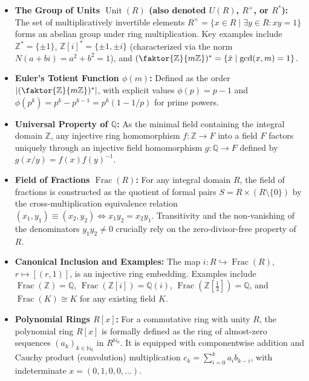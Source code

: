 \begin{overview}
\begin{itemize}
    \item \textbf{The Group of Units $\operatorname{Unit}(R)$ (also denoted $U(R)$, $R^\times$, or $R^*$):} The set of multiplicatively invertible elements $R^\times = \{x \in R \mid \exists y \in R \colon xy = 1\}$ forms an abelian group under ring multiplication. Key examples include $\mathbb{Z}^* = \{\pm 1\}$, $\mathbb{Z}[i]^* = \{\pm 1, \pm i\}$ (characterized via the norm $N(a+bi) = a^2 + b^2 = 1$), and $(\faktor{\mathbb{Z}}{m\mathbb{Z}})^* = \{\bar{x} \mid \gcd(x, m) = 1\}$.
    \item \textbf{Euler's Totient Function $\phi(m)$:} Defined as the order $|(\faktor{\mathbb{Z}}{m\mathbb{Z}})^*|$, with explicit values $\phi(p) = p - 1$ and $\phi(p^k) = p^k - p^{k-1} = p^k(1 - 1/p)$ for prime powers.
    \item \textbf{Universal Property of $\mathbb{Q}$:} As the minimal field containing the integral domain $\mathbb{Z}$, any injective ring homomorphism $f \colon \mathbb{Z} \to F$ into a field $F$ factors uniquely through an injective field homomorphism $g \colon \mathbb{Q} \to F$ defined by $g(x/y) = f(x)f(y)^{-1}$.
    \item \textbf{Field of Fractions $\operatorname{Frac}(R)$:} For any integral domain $R$, the field of fractions is constructed as the quotient of formal pairs $S = R \times (R \setminus \{0\})$ by the cross-multiplication equivalence relation $(x_1, y_1) \equiv (x_2, y_2) \iff x_1 y_2 = x_2 y_1$. Transitivity and the non-vanishing of the denominators $y_1 y_2 \neq 0$ crucially rely on the zero-divisor-free property of $R$.
    \item \textbf{Canonical Inclusion and Examples:} The map $i \colon R \hookrightarrow \operatorname{Frac}(R)$, $r \mapsto [(r, 1)]$, is an injective ring embedding. Examples include $\operatorname{Frac}(\mathbb{Z}) = \mathbb{Q}$, $\operatorname{Frac}(\mathbb{Z}[i]) = \mathbb{Q}(i)$, $\operatorname{Frac}(\mathbb{Z}[\frac{1}{3}]) = \mathbb{Q}$, and $\operatorname{Frac}(K) \cong K$ for any existing field $K$.
    \item \textbf{Polynomial Rings $R[x]$:} For a commutative ring with unity $R$, the polynomial ring $R[x]$ is formally defined as the ring of almost-zero sequences $(a_k)_{k \in \mathbb{N}_0}$ in $R^{\mathbb{N}_0}$. It is equipped with componentwise addition and Cauchy product (convolution) multiplication $c_k = \sum_{i=0}^k a_i b_{k-i}$, with indeterminate $x = (0, 1, 0, 0, \dots)$.
\end{itemize}
\end{overview}
